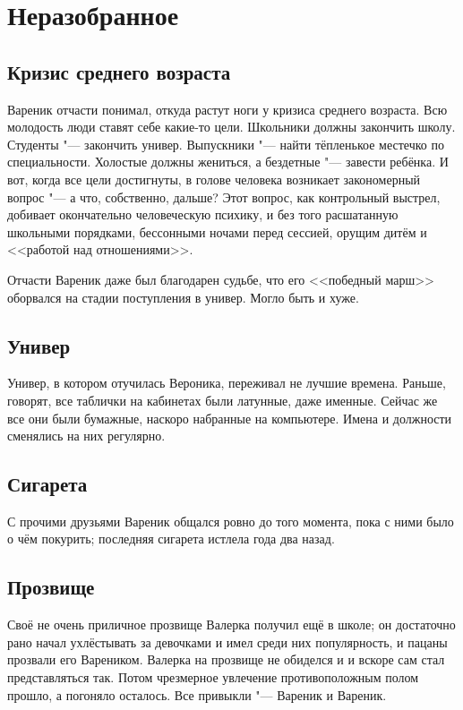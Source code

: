 \chapter{Неразобранное}

\section{Кризис среднего возраста}

Вареник отчасти понимал, откуда растут ноги у кризиса среднего возраста.
Всю молодость люди ставят себе какие-то цели.
Школьники должны закончить школу.
Студенты "--- закончить универ.
Выпускники "--- найти тёпленькое местечко по специальности.
Холостые должны жениться, а бездетные "--- завести ребёнка.
И вот, когда все цели достигнуты, в голове человека возникает закономерный вопрос "--- а что, собственно, дальше?
Этот вопрос, как контрольный выстрел, добивает окончательно человеческую психику, и без того расшатанную школьными порядками, бессонными ночами перед сессией, орущим дитём и <<работой над отношениями>>.

Отчасти Вареник даже был благодарен судьбе, что его <<победный марш>> оборвался на стадии поступления в универ.
Могло быть и хуже.

\section{Универ}

Универ, в котором отучилась Вероника, переживал не лучшие времена.
Раньше, говорят, все таблички на кабинетах были латунные, даже именные.
Сейчас же все они были бумажные, наскоро набранные на компьютере.
Имена и должности сменялись на них регулярно.

\section{Сигарета}

С прочими друзьями Вареник общался ровно до того момента, пока с ними было о чём покурить;
последняя сигарета истлела года два назад.

\section{Прозвище}

Своё не очень приличное прозвище Валерка получил ещё в школе;
он достаточно рано начал ухлёстывать за девочками и имел среди них популярность, и пацаны прозвали его Вареником.
Валерка на прозвище не обиделся и и вскоре сам стал представляться так.
Потом чрезмерное увлечение противоположным полом прошло, а погоняло осталось.
Все привыкли "--- Вареник и Вареник.


